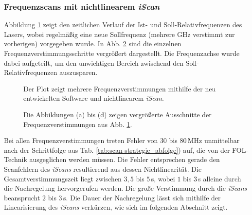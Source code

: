 \subsubsection{Frequenzscans mit nichtlinearem
\textit{iScan}}\label{subsubsec:frequenz_scans_nichtlineares_iScan}
Abbildung \ref{fig:laserscan_LUT-reset} zeigt den zeitlichen Verlauf der
Ist- und Soll-Relativfrequenzen des Lasers, wobei regelmäßig eine neue
Sollfrequenz (mehrere GHz verstimmt zur vorherigen) vorgegeben
wurde. In Abb. \ref{fig:laserscan_LUT-reset_zoom} sind die einzelnen
Frequenzverstimmungsschritte vergrößert dargestellt. Die Frequenzachse wurde
dabei aufgeteilt, um den unwichtigen Bereich zwischend den
Soll-Relativfrequenzen auszusparen.
\begin{figure}[h]
	 	\centering
	 	\footnotesize
		
		\caption[Frequenzscan, nichtlineares \textit{iScan}]{Der Plot zeigt mehrere
		Frequenzverstimmungen mithilfe der neu entwickelten Software und nichtlinearem
		\textit{iScan}.}
		\label{fig:laserscan_LUT-reset}
\end{figure}
\begin{figure}[hp]
 	\centering
 	\footnotesize
	\caption[Frequenzscan, nichtlineares \textit{iScan}, vergrößert]{Die
	Abbildungen (a) bis (d) zeigen vergrößerte Ausschnitte der
	Frequenzverstimmungen aus Abb. \ref{fig:laserscan_LUT-reset}.}
	\label{fig:laserscan_LUT-reset_zoom}
\end{figure}
Bei allen Frequenzverstimmungen treten Fehler von $30$ bis $80\,$MHz unmittelbar
nach der Schrittfolge aus Tab.
\ref{tab:scan-strategie_abfolge}) auf, die von der FOL-Technik ausgeglichen
werden müssen. Die Fehler entsprechen gerade den Scanfehlern des \textit{iScans}
resultierend aus dessen Nichtlinearität. Die Gesamtverstimmungszeit liegt
zwischen $3,5$ bis $5\,$s, wobei $1$ bis $3\,$s alleine durch die Nachregelung
hervorgerufen werden. Die große Verstimmung durch die \textit{iScans}
beansprucht $2$ bis $3\,$s. Die Dauer der Nachregelung lässt sich mithilfe
der Linearisierung des \textit{iScans} verkürzen, wie sich im folgenden Abschnitt zeigt.

